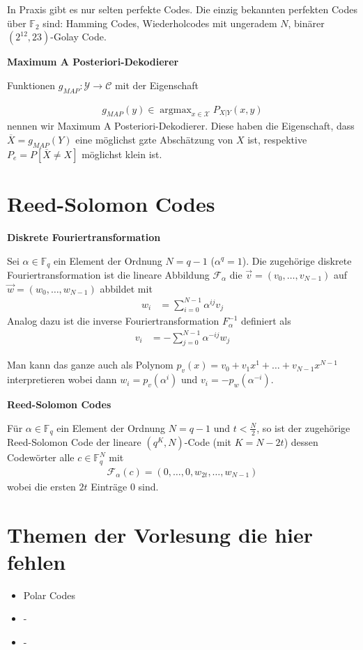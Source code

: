 \documentclass[25pt]{sciposter}
\newcommand{\F}{\mathcal{F}}
\newcommand{\X}{\mathcal{X}}
\newcommand{\C}{\mathcal{C}}
\newenvironment{defn}[1]{\begin{mdframed}[backgroundcolor=blue!10,innertopmargin=15pt, nobreak=true,innerbottommargin=15pt]
		\textbf{#1 }
	}
	{ 
	\end{mdframed}
}
\begin{document}
\begin{multicols}{3}
In Praxis gibt es nur selten perfekte Codes. Die einzig bekannten perfekten Codes über $\mathbb{F}_2$ sind: Hamming Codes, Wiederholcodes mit ungeradem $N$, binärer $(2^{12},23)$-Golay Code.

\begin{defn}{Maximum A Posteriori-Dekodierer}
	Funktionen $g_{MAP} : \mathcal{Y}\to \C$ mit der Eigenschaft 
	
	\begin{align*}
		g_{MAP}(y) \in \operatorname{argmax}_{x\in \X} P_{X|Y} (x,y)
	\end{align*}
	nennen wir Maximum A Posteriori-Dekodierer. Diese haben die Eigenschaft, dass $\overline{X} = g_{MAP}(Y)$ eine möglichst gzte Abschätzung von $X$ ist, respektive $P_e = P[\overline{X}\neq X]$ möglichst klein ist.
\end{defn}


\section{Reed-Solomon Codes}

\begin{defn}{Diskrete Fouriertransformation}
	Sei $\alpha \in \mathbb{F}_q$ ein Element der Ordnung $N = q-1$ ($\alpha^q = 1$). Die zugehörige diskrete Fouriertransformation ist die lineare Abbildung $\F_\alpha$ die $\vec{v} = (v_0,\ldots,v_{N-1})$ auf $\vec{w} = (w_0,\ldots,w_{N-1})$ abbildet mit 
	\begin{align*}
		w_i &= \sum_{i=0}^{N-1} \alpha^{ij} v_j
	\end{align*}
	Analog dazu ist die inverse Fouriertransformation $F_\alpha^{-1}$ definiert als 
	\begin{align*}
		v_i &= - \sum_{j=0}^{N-1} \alpha^{-ij}w_j
	\end{align*}
\end{defn}
Man kann das ganze auch als Polynom $p_v(x) = v_0 + v_1x^1 + \ldots + v_{N-1}x^{N-1}$ interpretieren wobei dann $w_i = p_v(\alpha^i)$ und $v_i = -p_w(\alpha^{-i})$.

\begin{defn}{Reed-Solomon Codes}
	Für $\alpha\in \mathbb{F}_q$ ein Element der Ordnung $N=q-1$ und $t<\frac{N}{2}$, so ist der zugehörige Reed-Solomon Code der lineare $(q^K,N)$-Code (mit $K=N-2t$) dessen Codewörter alle $c\in \mathbb{F}_q^N$ mit 
	\begin{align*}
		\F_\alpha (c) = (0,\ldots,0,w_{2t},\ldots,w_{N-1})
	\end{align*}
	wobei die ersten $2t$ Einträge 0 sind.
\end{defn}


\section{Themen der Vorlesung die hier fehlen}

\begin{itemize}
	\item Polar Codes
	\item -
	\item -
\end{itemize}



\newpage

\end{multicols}
\end{document}
